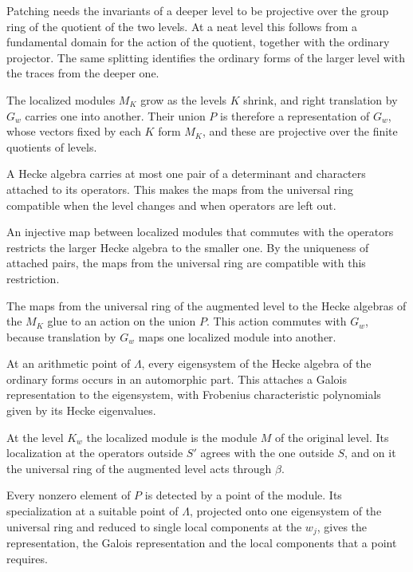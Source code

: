Patching needs the invariants of a deeper level to be projective over the group ring of the quotient of the two levels. At a neat level this follows from a fundamental domain for the action of the quotient, together with the ordinary projector. The same splitting identifies the ordinary forms of the larger level with the traces from the deeper one.

The localized modules $M_K$ grow as the levels $K$ shrink, and right translation by $G_w$ carries one into another. Their union $P$ is therefore a representation of $G_w$, whose vectors fixed by each $K$ form $M_K$, and these are projective over the finite quotients of levels.

A Hecke algebra carries at most one pair of a determinant and characters attached to its operators. This makes the maps from the universal ring compatible when the level changes and when operators are left out.

An injective map between localized modules that commutes with the operators restricts the larger Hecke algebra to the smaller one. By the uniqueness of attached pairs, the maps from the universal ring are compatible with this restriction.

The maps from the universal ring of the augmented level to the Hecke algebras of the $M_K$ glue to an action on the union $P$. This action commutes with $G_w$, because translation by $G_w$ maps one localized module into another.

At an arithmetic point of $\Lambda$, every eigensystem of the Hecke algebra of the ordinary forms occurs in an automorphic part. This attaches a Galois representation to the eigensystem, with Frobenius characteristic polynomials given by its Hecke eigenvalues.

At the level $K_w$ the localized module is the module $M$ of the original level. Its localization at the operators outside $S'$ agrees with the one outside $S$, and on it the universal ring of the augmented level acts through $\beta$.

Every nonzero element of $P$ is detected by a point of the module. Its specialization at a suitable point of $\Lambda$, projected onto one eigensystem of the universal ring and reduced to single local components at the $w_j$, gives the representation, the Galois representation and the local components that a point requires.

